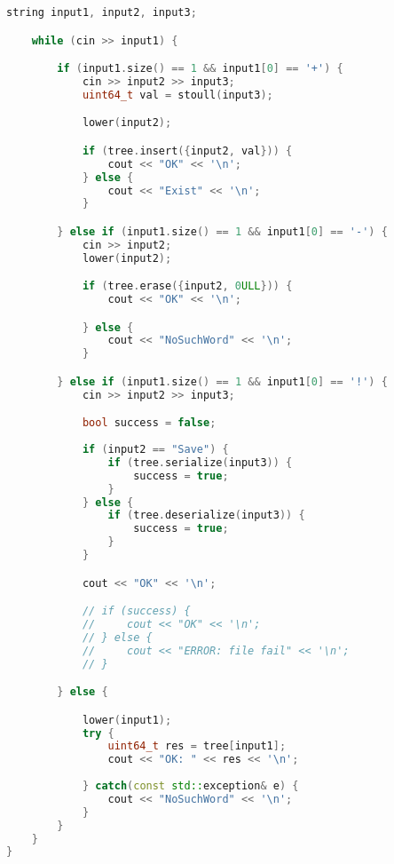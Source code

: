 \begin{lstlisting}[language=C++]
    string input1, input2, input3;

    while (cin >> input1) {

        if (input1.size() == 1 && input1[0] == '+') {
            cin >> input2 >> input3;
            uint64_t val = stoull(input3);

            lower(input2);

            if (tree.insert({input2, val})) {
                cout << "OK" << '\n';
            } else {
                cout << "Exist" << '\n';
            }

        } else if (input1.size() == 1 && input1[0] == '-') {
            cin >> input2;
            lower(input2);

            if (tree.erase({input2, 0ULL})) {
                cout << "OK" << '\n';

            } else {
                cout << "NoSuchWord" << '\n';
            }

        } else if (input1.size() == 1 && input1[0] == '!') {
            cin >> input2 >> input3;

            bool success = false;
            
            if (input2 == "Save") {
                if (tree.serialize(input3)) {
                    success = true;
                }
            } else {
                if (tree.deserialize(input3)) {
                    success = true;
                }
            }

            cout << "OK" << '\n';

            // if (success) {
            //     cout << "OK" << '\n';
            // } else {
            //     cout << "ERROR: file fail" << '\n';
            // }

        } else {

            lower(input1);
            try {
                uint64_t res = tree[input1];
                cout << "OK: " << res << '\n';
            
            } catch(const std::exception& e) {
                cout << "NoSuchWord" << '\n';
            }
        }
    }
}
\end{lstlisting}

